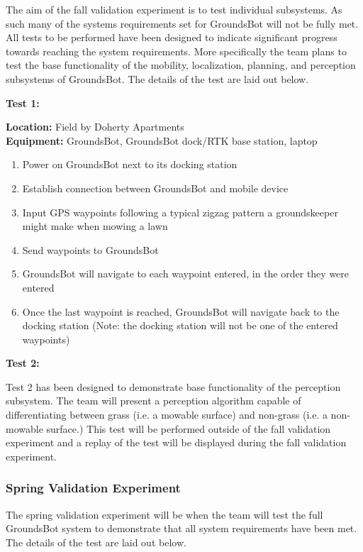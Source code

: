 \documentclass[12pt]{extarticle}
\begin{document}
	The aim of the fall validation experiment is to test individual subsystems. As such many of the systems requirements set for GroundsBot will not be fully met. All tests to be performed have been designed to indicate significant progress towards reaching the system requirements. More specifically the team plans to test the base functionality of the mobility, localization, planning, and perception subsystems of GroundsBot. The details of the test are laid out below.
\\
\begin{center}
\textbf{Test 1:}
\end{center}
 \textbf{Location:} Field by Doherty Apartments \cite{interview-guenther}
\\
\textbf{Equipment:} GroundsBot, GroundsBot dock/RTK base station, laptop
\begin{enumerate}
  \item Power on GroundsBot next to its docking station
  \item Establish connection between GroundsBot and mobile device
  \item Input GPS waypoints following a typical zigzag pattern a groundskeeper might make when mowing a lawn
  \item Send waypoints to GroundsBot
  \item GroundsBot will navigate to each waypoint entered, in the order they were entered
  \item Once the last waypoint is reached, GroundsBot will navigate back to the docking station (Note: the docking station will not be one of the entered waypoints)
\end{enumerate}

\begin{center}
\textbf{Test 2:}
\end{center}
Test 2 has been designed to demonstrate base functionality of the perception subsystem. The team will present a perception algorithm capable of differentiating between grass (i.e. a mowable surface) and non-grass (i.e. a non-mowable surface.) This test will be performed outside of the fall validation experiment and a replay of the test will be displayed during the fall validation experiment.

\newpage
\subsubsection{Spring Validation Experiment}

	The spring validation experiment will be when the team will test the full GroundsBot system to demonstrate that all system requirements have been met. The details of the test are laid out below.
\end{document}
